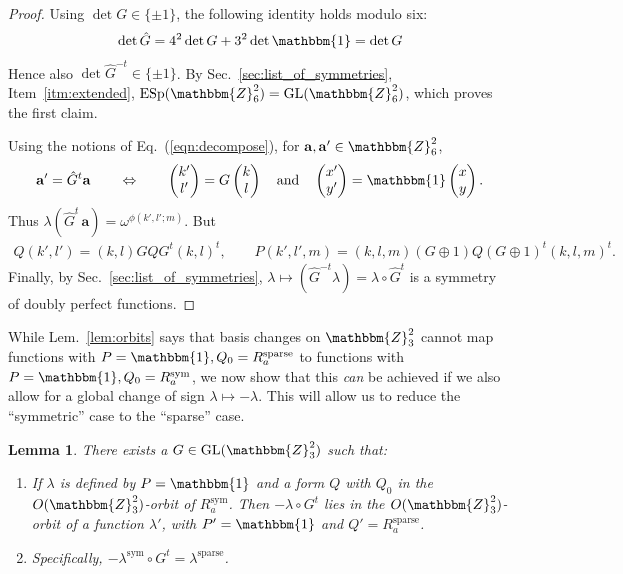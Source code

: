 \documentclass[aps,nofootinbib,floatfix,a4paper]{revtex4}
\newtheorem{lemma}[theorem]{Lemma}
\newcommand{\sym}{^\mathrm{sym}}
\newcommand{\sparse}{^\mathrm{sparse}}
\newcommand{\1}{\mbox{$\mathbf{1}$}}
\def\ZZ{\mathbbm{Z}}
\def\Id{\mathbbm{1}}
\DeclareMathOperator{\ESp}{ESp}
\DeclareMathOperator{\GL}{GL}
\renewcommand{\vec}{\mathbf}
\begin{document}
\begin{proof}
	Using $\det G\in \{\pm1\}$, the following identity holds modulo six:
	\begin{align*}
		\det \hat G = 4^2 \det G + 3^2 \det \Id = \det G
	\end{align*}
	Hence also $\det \hat G^{-t}\in \{\pm1\}$.
	By Sec.~\ref{sec:list_of_symmetries}, Item~\ref{itm:extended}, $\ESp(\ZZ_6^2)=\GL(\ZZ_6^2)$, which proves the first claim.

	Using the notions of Eq.~(\ref{eqn:decompose}), for $\vec a, \vec a' \in \ZZ_6^2$,
	\begin{align*}
		\vec a' = \hat G^t \vec a
		\qquad
		\Leftrightarrow
		\qquad
		\begin{pmatrix}
			k' \\
			l'
		\end{pmatrix}
		=
		G
		\begin{pmatrix}
			k \\
			l
		\end{pmatrix}
		\quad\text{and}\quad
		\begin{pmatrix}
			x' \\
			y'
		\end{pmatrix}
		=
		\Id
		\begin{pmatrix}
			x \\
			y
		\end{pmatrix}.
	\end{align*}
	Thus $\lambda(\hat G^{t}\,\vec a) = \omega^{\phi(k',l';m)}$. 
	But
	\begin{align*}
		Q(k',l') = 
		(k,l)
		G Q G^{t} 
		(k,l)^t,
		\qquad
		P(k',l',m) = 
		(k,l,m)
		(G\oplus 1) Q (G \oplus 1)^t
		(k,l,m)^t.
	\end{align*}
	Finally, by Sec.~\ref{sec:list_of_symmetries}, $\lambda\mapsto (\hat G^{-t}\lambda) = \lambda\circ \hat G^t$ is a symmetry of doubly perfect functions.
\end{proof}

While Lem.~\ref{lem:orbits} says that basis changes on $\ZZ_3^2$ cannot map functions with 
$P=\Id, Q_0=R\sparse_a$
to functions with 
$P=\Id, Q_0=R\sym_a$,
we now show that this \emph{can} be achieved if we also allow for a global change of sign $\lambda\mapsto-\lambda$.
This will allow us to reduce the ``symmetric'' case to the ``sparse'' case.

\begin{lemma}\label{lem:orbit_connector}
	There exists a $G\in\GL(\ZZ_3^2)$ such that:
	\begin{enumerate}
		\item
			If $\lambda$ is defined by $P=\Id$ and a form $Q$ with $Q_0$ in the $O(\ZZ_3^2)$-orbit of $R\sym_a$.
			Then $-\lambda\circ G^t$ lies in the $O(\ZZ_3^2)$-orbit of a function $\lambda'$, with
			$P'=\Id$ and $Q'=R\sparse_a$.

		\item
			Specifically, $-\lambda\sym \circ G^t = \lambda\sparse$.
	\end{enumerate}
\end{lemma}
\end{document}
